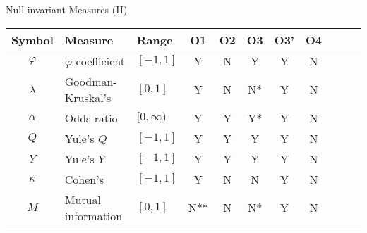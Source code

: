 \begin{frame}{Null-invariant Measures (II)}
	\centering
	\begin{tabular}{|c|l|l|c|c|c|c|c|c|c|c|}
		\hline
		\textbf{Symbol} & \textbf{Measure}      & \textbf{Range} &
		\textbf{O1}     & \textbf{O2}           & \textbf{O3}    & \textbf{O3'} &
		\textbf{O4}                                                                        \\\hline
		$\varphi$       & $\varphi$-coefficient & $[-1,1]$       & Y            & N & Y  &
		Y
		                &
		N                                                                                  \\
		$\lambda$       & Goodman-Kruskal's     & $[0,1]$        & Y            & N & N* &
		Y               &
		N                                                                                  \\
		$\alpha$        & Odds ratio            & $[0,\infty)$   & Y            & Y & Y* &
		Y               &
		N                                                                                  \\
		$Q$             & Yule's $Q$            & $[-1,1]$       & Y            & Y & Y  &
		Y               &
		N                                                                                  \\
		$Y$             & Yule's $Y$            & $[-1,1]$       & Y            & Y & Y  &
		Y               &
		N                                                                                  \\
		$\kappa$        & Cohen's               & $[-1,1]$       & Y            & N & N  &
		Y               &
		N                                                                                  \\
		$M$             & Mutual information    & $[0,1]$        & N**          & N & N* &
		Y               &
		N                                                                                  \\\hline
	\end{tabular}
\end{frame}

